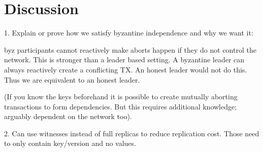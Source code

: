 \section{Discussion}
1. Explain or prove how we satisfy byzantine independence and why we want it:

byz participants cannot reactively make aborts happen if they do not control the network. 
This is stronger than a leader based setting.  A byzantine leader can always reactively create a conflicting TX. An honest leader would not do this. 
Thus we are equivalent to an honest leader.

(If you know the keys beforehand it is possible to create mutually aborting transactions to form dependencies. But this requires additional knowledge; arguably dependent on the network too).


2. Can use witnesses instead of full replicas to reduce replication cost. Those need to only contain key/version and no values.


